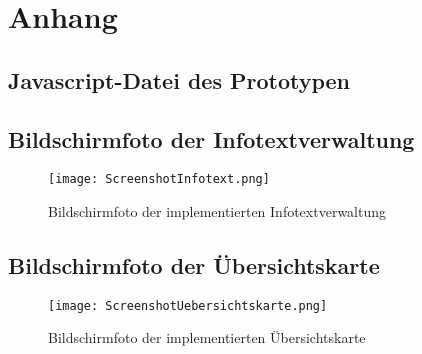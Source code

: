 \section{Anhang}
\label{sec:Anhang}

\subsection{Javascript-Datei des Prototypen}
\label{sec:AnhangJavascriptPrototyp}



\subsection{Bildschirmfoto der Infotextverwaltung}
\label{sec:BildschirmfotoInfotextverwaltung}

\begin{figure}[htb]
\texttt{[image: ScreenshotInfotext.png]}
\caption[Bildschirmfoto Infotexte]{Bildschirmfoto der implementierten Infotextverwaltung}
\label{fig:ScreenshotInfotext}
\end{figure}
\centering

\subsection{Bildschirmfoto der Übersichtskarte}
\label{sec:BildschirmfotoUebersichtskarte}

\begin{figure}[htb]
\texttt{[image: ScreenshotUebersichtskarte.png]}
\caption[Bildschirmfoto Übersichtskarte]{Bildschirmfoto der implementierten Übersichtskarte}
\label{fig:ScreenshotUebersichtskarte}
\end{figure}
\centering